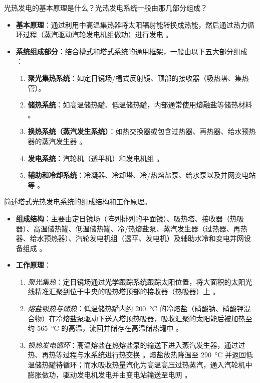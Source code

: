 \begin{problem}\label{exer:think_04_solar_07}
光热发电的基本原理是什么？光热发电系统一般由那几部分组成？
\end{problem}

\begin{solution}
\begin{itemize}
\item \textbf{基本原理}：通过利用中高温集热器将太阳辐射能转换成热能，然后通过热力循环过程（蒸汽驱动汽轮发电机组做功）进行发电 。
\item \textbf{系统组成部分}：结合槽式和塔式系统的通用框架，一般由以下五大部分组成 ：
\begin{enumerate}
\item \textbf{聚光集热系统}：如定日镜场/槽式反射镜、顶部的接收器（吸热塔、集热管）。
\item \textbf{储热系统}：如高温储热罐、低温储热罐，内部通常使用熔融盐等储热材料 。
\item \textbf{换热系统（蒸汽发生系统）}：如热交换器或包含过热器、再热器、给水预热器的蒸汽发生器 。
\item \textbf{发电系统}：汽轮机（透平机）和发电机组 。
\item \textbf{辅助和冷却系统}：冷凝器、冷却塔、冷/热熔盐泵、给水泵以及并网变电站等 。
\end{enumerate}
\end{itemize}
\end{solution}

\begin{problem}\label{exer:think_04_solar_08}
简述塔式光热发电系统的组成结构和工作原理。
\end{problem}

\begin{solution}
\begin{itemize}
\item \textbf{组成结构}：主要由定日镜场（阵列排列的平面镜）、吸热塔、接收器（热吸器）、高温储热罐、低温储热罐、冷/热熔盐泵、蒸汽发生器（过热器、再热器、给水预热器）、汽轮发电机组（透平、发电机）及辅助水冷和变电并网设备组成 。
\item \textbf{工作原理}：
\begin{enumerate}
\item \emph{聚光集热}：定日镜场通过光学跟踪系统跟踪太阳位置，将大面积的太阳光线精准汇聚到位于中央的吸热塔顶部的接收器（热吸器）上 。
\item \emph{熔盐吸热与储热}：低温储热罐内约 \qty{200}{\degreeCelsius} 的冷熔盐（硝酸钠、硝酸钾混合物）在冷熔盐泵驱动下送入塔顶热吸器，吸收汇聚的太阳能后被加热至约 \qty{565}{\degreeCelsius} 的高温，流回并储存在高温储热罐中 。
\item \emph{换热发电循环}：高温熔盐在热熔盐泵的输送下进入蒸汽发生器，通过过热、再热等过程与水系统进行热交换 。熔盐放热降温至 \qty{290}{\degreeCelsius} 并返回低温储热罐待循环；而水吸收热量汽化为高温高压过热蒸汽，通入汽轮机中膨胀做功，驱动发电机发电并由变电站输送至电网 。
\end{enumerate}
\end{itemize}
\end{solution}

